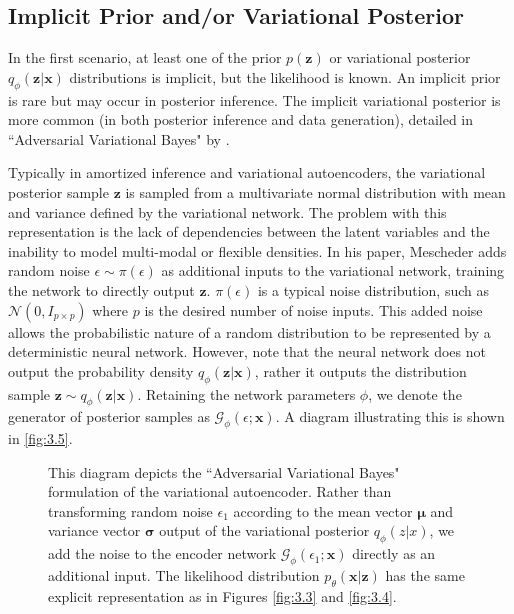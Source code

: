 \documentclass[honours,12pt]{unswthesis}
\numberwithin{equation}{section}
\theoremstyle{definition}
\begin{document}
\subsection{Implicit Prior and/or Variational Posterior}\label{sec:3.8.1}
In the first scenario, at least one of the prior $p(\bm{z})$ or variational posterior $q_\phi(\bm{z}|\bm{x})$ distributions is implicit, but the likelihood is known. An implicit prior is rare but may occur in posterior inference. The implicit variational posterior is more common (in both posterior inference and data generation), detailed in ``Adversarial Variational Bayes" by \citet{mescheder}.

Typically in amortized inference and variational autoencoders, the variational posterior sample $\bm{z}$ is sampled from a multivariate normal distribution with mean and variance defined by the variational network. The problem with this representation is the lack of dependencies between the latent variables and the inability to model multi-modal or flexible densities. In his paper, Mescheder adds random noise $\epsilon\sim \pi(\epsilon)$ as additional inputs to the variational network, training the network to directly output $\bm{z}$. $\pi(\epsilon)$ is a typical noise distribution, such as $\mathcal{N}(0,I_{p\times p})$ where $p$ is the desired number of noise inputs. This added noise allows the probabilistic nature of a random distribution to be represented by a deterministic neural network. However, note that the neural network does not output the probability density $q_\phi(\bm{z}|\bm{x})$, rather it outputs the distribution sample $\bm{z}\sim q_\phi(\bm{z}|\bm{x})$. Retaining the network parameters $\phi$, we denote the generator of posterior samples as $\mathcal{G}_\phi(\epsilon;\bm{x})$. A diagram illustrating this is shown in \autoref{fig:3.5}.
\begin{figure}[h]
  \centering
   \caption{\small This diagram depicts the ``Adversarial Variational Bayes" formulation of the variational autoencoder. Rather than transforming random noise $\epsilon_1$ according to the mean vector $\bm{\mu}$ and variance vector $\bm{\sigma}$ output of the variational posterior $q_\phi(z|x)$, we add the noise to the encoder network $\mathcal{G}_\phi(\epsilon_1;\bm{x})$ directly as an additional input. The likelihood distribution $p_\theta(\bm{x}|\bm{z})$ has the same explicit representation as in Figures \ref{fig:3.3} and \ref{fig:3.4}.}
   \label{fig:3.5}
\end{figure}
\end{document}
